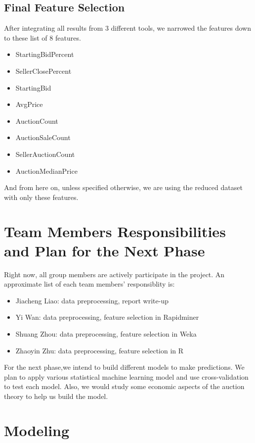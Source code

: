 \documentclass[CEJM,PDF]{cej} %
\begin{document}
\subsection{Final Feature Selection}
After integrating all results from 3 different tools, we narrowed the features down to these list of 8 features.
\begin{itemize}
\item StartingBidPercent
\item SellerClosePercent
\item StartingBid
\item AvgPrice
\item AuctionCount
\item AuctionSaleCount
\item SellerAuctionCount
\item AuctionMedianPrice
\end{itemize}
And from here on, unless specified otherwise, we are using the reduced dataset with only these features.


\section{Team Members Responsibilities and Plan for the Next Phase}

Right now, all group members are actively participate in the project. An approximate list of each team members' responsiblity is:
\begin{itemize}
\item Jiacheng Liao: data preprocessing, report write-up
\item Yi Wan: data preprocessing, feature selection in Rapidminer
\item Shuang Zhou: data preprocessing, feature selection in Weka
\item Zhaoyin Zhu: data preprocessing, feature selection in R
\end{itemize}

For the next phase,we intend to build different models to make predictions. We plan to apply various statistical machine learning model and use cross-validation to test each model. Also, we would study some economic aspects of the auction theory to help us build the model.



\section{Modeling}
\end{document}

